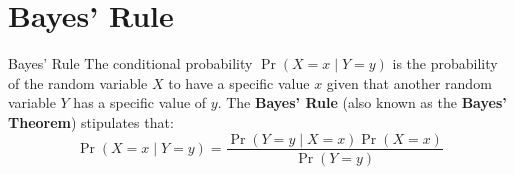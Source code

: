 \documentclass[9pt,dvipsnames]{beamer}
\begin{document}
\section{Bayes' Rule}
\begin{frame}{Bayes' Rule}
	The conditional probability $\operatorname{Pr}(X=x \mid Y=y)$ is the probability of the random variable $X$ to have a specific value $x$ given that another random variable $Y$ has a specific value of $y$. The \textbf{Bayes' Rule} (also known as the \textbf{Bayes' Theorem}) stipulates that:
	$$
	\operatorname{Pr}(X=x \mid Y=y)=\frac{\operatorname{Pr}(Y=y \mid X=x) \operatorname{Pr}(X=x)}{\operatorname{Pr}(Y=y)}
	$$
\end{frame}
\end{document}
